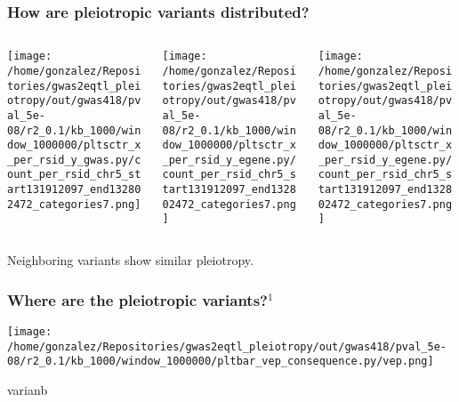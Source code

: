 \documentclass{beamer}
\begin{document}
\begin{frame}
\frametitle{How are pleiotropic variants distributed?}

\begin{columns}
\begin{column}{0.32\textwidth}
    \begin{center}
\texttt{[image: /home/gonzalez/Repositories/gwas2eqtl\_pleiotropy/out/gwas418/pval\_5e-08/r2\_0.1/kb\_1000/window\_1000000/pltsctr\_x\_per\_rsid\_y\_gwas.py/count\_per\_rsid\_chr5\_start131912097\_end132802472\_categories7.png]}
     \end{center}
\end{column}
\begin{column}{0.32\textwidth}
    \begin{center}
\texttt{[image: /home/gonzalez/Repositories/gwas2eqtl\_pleiotropy/out/gwas418/pval\_5e-08/r2\_0.1/kb\_1000/window\_1000000/pltsctr\_x\_per\_rsid\_y\_egene.py/count\_per\_rsid\_chr5\_start131912097\_end132802472\_categories7.png]}
     \end{center}
\end{column}
\begin{column}{0.32\textwidth}
    \begin{center}
\texttt{[image: /home/gonzalez/Repositories/gwas2eqtl\_pleiotropy/out/gwas418/pval\_5e-08/r2\_0.1/kb\_1000/window\_1000000/pltsctr\_x\_per\_rsid\_y\_egene.py/count\_per\_rsid\_chr5\_start131912097\_end132802472\_categories7.png]}
     \end{center}
\end{column}
\end{columns}
%
\vfill
%
Neighboring variants show similar pleiotropy.

\end{frame}

\begin{frame}
\frametitle{Where are the pleiotropic variants?$^1$}

    \begin{center}
\texttt{[image: /home/gonzalez/Repositories/gwas2eqtl\_pleiotropy/out/gwas418/pval\_5e-08/r2\_0.1/kb\_1000/window\_1000000/pltbar\_vep\_consequence.py/vep.png]}
     \end{center}
varianb
\let\thefootnote\relax{}
     
\end{frame}
\end{document}
